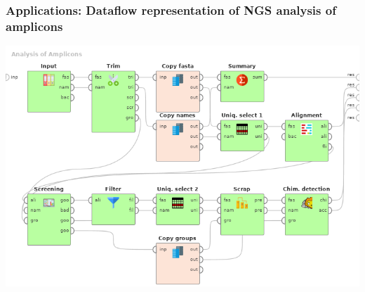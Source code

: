 \documentclass[10pt]{beamer}
\begin{document}
\begin{frame}
  \frametitle{Applications: Dataflow representation of NGS analysis of amplicons}
  \begin{center}
    \includegraphics[width=0.9\linewidth]{Dataflow-color-en.png}
  \end{center}
\end{frame}
\end{document}
